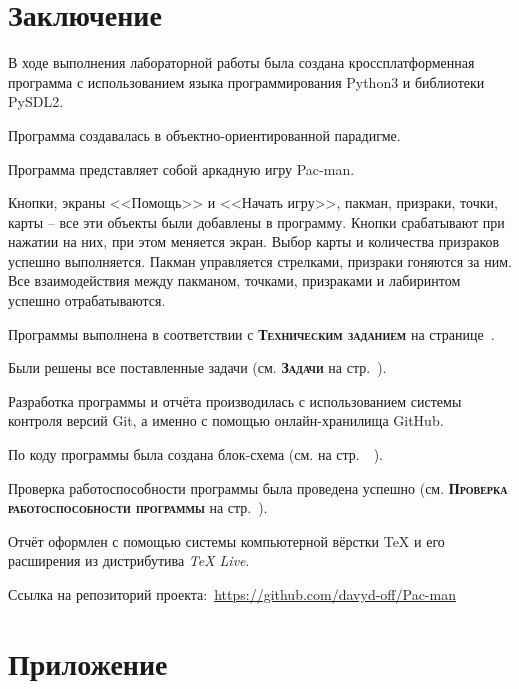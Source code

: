 \documentclass[14pt, oneside]{altsu-report}
\begin{document}

 

\chapter*{Заключение}
В ходе выполнения лабораторной работы была создана кроссплатформенная программа с использованием языка программирования Python3 и библиотеки PySDL2.

Программа создавалась в объектно-ориентированной парадигме.

Программа представляет собой аркадную игру Pac-man.

Кнопки, экраны <<Помощь>> и <<Начать игру>>, пакман, призраки, точки, карты -- все эти объекты были добавлены в программу. Кнопки срабатывают при нажатии на них, при этом меняется экран. Выбор карты и количества призраков успешно выполняется. Пакман управляется стрелками, призраки гоняются за ним. Все взаимодействия между пакманом, точками, призраками и лабиринтом успешно отрабатываются. 

Программы выполнена в соответствии с \textbf{\textsc{Техническим заданием}} на странице~\pageref{sec:ch01/sec01}.

Были решены все поставленные задачи (см. \textbf{\textsc{Задачи}} на стр.~\pageref{zadachi}).

Разработка программы и отчёта производилась с использованием системы контроля версий Git, а именно с помощью онлайн-хранилища GitHub.

По коду программы была создана блок-схема (см. на стр.~\pageref{fig7}~\pageref{fig8}).

Проверка работоспособности программы была проведена успешно (см. \textbf{\textsc{Проверка работоспособности программы}} на стр.~\pageref{sec:ch02/sec02}).

Отчёт оформлен с помощью системы компьютерной вёрстки \TeX{} и его расширения \XeTeX{} из дистрибутива \textit{TeX Live}.

Ссылка на репозиторий проекта:~\textcolor{blue}{\url{https://github.com/davyd-off/Pac-man}}

\newpage
{}
\printbibliography[title={Список использованной литературы}]

\appendix
\newpage
\chapter*{\raggedleft\label{appendix1}Приложение}
\end{document}
